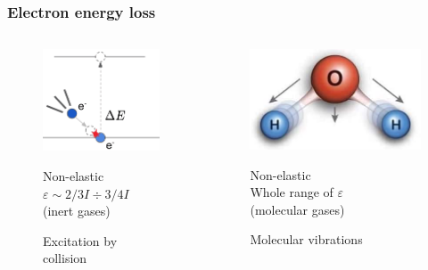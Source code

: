 \documentclass{beamer}
\begin{document}
	\begin{frame}
		\frametitle{Electron energy loss}
				
		\begin{columns}[t]
			\begin{figure}
				\centering
				\includegraphics[width=0.8\linewidth]{res/excitation.png}
				\caption*{Excitation by collision}
				
				Non-elastic\\
				$\varepsilon \sim 2/3I \div 3/4I$\\
				(inert gases)
			\end{figure}
			
			\vspace{10pt}
			\begin{figure}
				\centering
				\includegraphics[width=1.0\linewidth]{res/vibrations.jpg}
				\caption*{Molecular vibrations}
				Non-elastic\\
				Whole range of $\varepsilon$\\
				(molecular gases)
			\end{figure}
			

\end{columns}
\end{frame}
\end{document}

